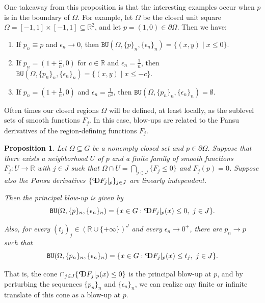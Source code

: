 \documentclass{article}
\newtheorem{prop}[theorem]{Proposition}
\theoremstyle{definition}
\newcommand{\BU}{\mathtt{BU}}
\newcommand{\pD}{\text{\scalebox{-1}[1]{$\mathrm{P}$}\!\!$\mathrm{D}$}}
\newcommand{\R}{{\mathbb R}}
\begin{document}
One takeaway from this proposition is that the interesting examples occur when $p$ is in the boundary of $\Omega$. For example, let $\Omega$ be the closed unit square $\Omega = [-1,1]\times[-1,1] \subseteq \R^2$, and let $p = (1,0) \in \partial \Omega$. Then we have:
\begin{enumerate}
\item If $p_n \equiv p$ and $\epsilon_n \to 0$, then $\BU(\Omega,\{p\}_n,\{\epsilon_n\}_n) = \{(x,y) \mid x\leq 0\}$.
\item If $p_n = \left(1 + \frac cn,0\right)$ for $c \in \R$ and $\epsilon_n =\frac1n$, then $\BU(\Omega,\{p_n\}_n,\{\epsilon_n\}_n) = \{(x,y) \mid x\leq -c\}$.
\item If $p_n = \left(1 + \frac1n,0\right)$ and $\epsilon_n =\frac1{n^2}$, then $\BU(\Omega,\{p_n\}_n,\{\epsilon_n\}_n) = \emptyset$.
\end{enumerate}

Often times our closed regions $\Omega$ will be defined, at least locally, as the sublevel sets of smooth functions $F_j$. In this case, blow-ups are related to the Pansu derivatives of the region-defining functions $F_j$.

\begin{prop}\label{prop5e8c4f94}{\cite[Proposition 3.7]{FNG}}
	Let $\Omega\subseteq G$ be a nonempty closed set and $p\in\partial\Omega$.
	Suppose that there exists a neighborhood $U$ of $p$ and a finite family of smooth functions $F_j:U\to\R$ with $j\in J$ such that $\Omega\cap U = \bigcap_{j\in J}\{F_j\le0\}$ and $F_j(p)=0$.
	Suppose also the Pansu derivatives $\{\pD F_j|_p\}_{j\in J}$ are linearly independent.
	
	Then the principal blow-up is given by 
	\[ \BU(\Omega,\{p\}_n,\{\epsilon_n\}_n) = \{x\in G: \pD F_j|_p(x)\le 0,\ j\in J\}.   \]
	
	Also, for every $(t_j)_j\in(\R\cup \{+\infty\})^J$ and every $\epsilon_n\to 0^+$, there are $p_n\to p$  such that 
	\begin{equation}\label{eq5f75bda1}
	\BU(\Omega,\{p_n\}_n,\{\epsilon_n\}_n)
	= \{x\in G: \pD F_j|_p(x)\le t_j,\ j\in J\} .
	\end{equation}
\end{prop}

That is, the cone $\cap_{j\in J} \{\pD F_j\vert_p(x) \leq 0\}$ is the principal blow-up at $p$, and by perturbing the sequences $\{p_n\}_n$ and $\{\epsilon_n\}_n$, we can realize any finite or infinite translate of this cone as a blow-up at $p$.
\end{document}
